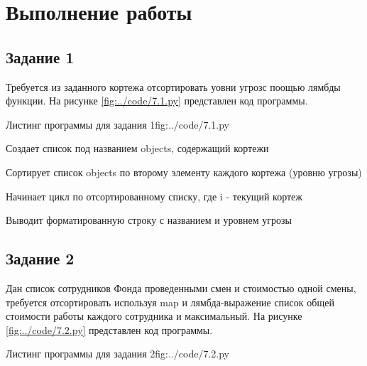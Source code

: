\documentclass{vvsu}
\begin{document}
\toc

\section{Выполнение работы}
\label{sec:execution}

\subsection{Задание 1}
  Требуется из заданного кортежа отсортировать уовни угрозс поощью лямбды функции.
На рисунке \ref{fig:../code/7.1.py} представлен код программы.

\begin{vvsu_figure}{Листинг программы для задания 1}{fig:../code/7.1.py}
  \begin{minipage}{.75\textwidth}
    
  \end{minipage}
\end{vvsu_figure}

\begin{vvsu_list}
  \item Создает список под названием objects, содержащий кортежи
  \item Сортирует список objects по второму элементу каждого кортежа (уровню угрозы)
  \item Начинает цикл по отсортированному списку, где i - текущий кортеж
\end{vvsu_list}
  Выводит форматированную строку с названием и уровнем угрозы

\subsection{Задание 2}
  Дан список сотрудников Фонда проведенными смен и стоимостью одной смены, требуется отсортировать используя map и лямбда-выражение список общей стоимости работы каждого сотрудника и максимальный.
На рисунке \ref{fig:../code/7.2.py} представлен код программы.

\begin{vvsu_figure}{Листинг программы для задания 2}{fig:../code/7.2.py}
  \begin{minipage}{.75\textwidth}
    
  \end{minipage}
\end{vvsu_figure}
\end{document}
